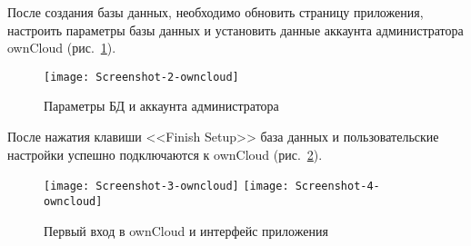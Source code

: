 После создания базы данных, необходимо обновить страницу приложения, настроить параметры базы данных и установить данные аккаунта администратора ownCloud (рис.~\ref{pic:db-own}).

\begin{figure}[ht]
    \centering
    \texttt{[image: Screenshot-2-owncloud]}
    \caption{Параметры БД и аккаунта администратора}\label{pic:db-own}
\end{figure}

После нажатия клавиши <<Finish Setup>> база данных и пользовательские настройки успешно подключаются к ownCloud (рис.~\ref{pic:interface-own}).

\begin{figure}[ht]
    \centering
    \texttt{[image: Screenshot-3-owncloud]}
    \texttt{[image: Screenshot-4-owncloud]}
    \caption{Первый вход в ownCloud и интерфейс приложения}\label{pic:interface-own}
\end{figure}

\clearpage
